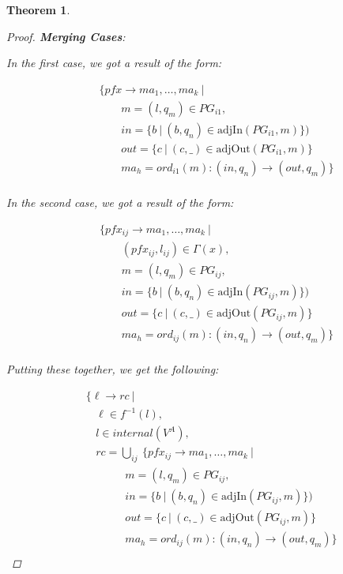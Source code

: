 \documentclass[twocolumn, openany]{sig-alternate-10pt}
\newtheorem{thm}{Theorem}
\begin{document}
\begin{thm}
\begin{proof}
  \vspace{1em}
  \textbf{Merging Cases}:

  In the first case, we got a result of the form:

  \[ \begin{array}{l}
     ~~~~~~~~~ \{ pfx \rightarrow ma_1, \dots, ma_k ~\vert~ \\
     ~~~~~~~~~~~~~~~~~~ m = (l,q_m) \in PG_{i1}, \\
     ~~~~~~~~~~~~~~~~~~ in = \{ b ~\vert~ (b,q_n) \in \text{adjIn}(PG_{i1},m) \}) \\
     ~~~~~~~~~~~~~~~~~~ out = \{ c ~\vert~ (c,\_) \in \text{adjOut}(PG_{i1},m) \} \\
     ~~~~~~~~~~~~~~~~~~ ma_h = ord_{i1}(m) : (in,q_n) \rightarrow (out,q_m) \} \\
  \end{array} \]%

  In the second case, we got a result of the form:

 \[ \begin{array}{l}
     ~~~~~~~~~ \{ pfx_{ij} \rightarrow ma_1, \dots, ma_k ~\vert~ \\
     ~~~~~~~~~~~~~~~~~~ (pfx_{ij}, l_{ij}) \in \Gamma(x), \\
     ~~~~~~~~~~~~~~~~~~ m = (l,q_m) \in PG_{ij}, \\
     ~~~~~~~~~~~~~~~~~~ in = \{ b ~\vert~ (b,q_n) \in \text{adjIn}(PG_{ij},m) \}) \\
     ~~~~~~~~~~~~~~~~~~ out = \{ c ~\vert~ (c,\_) \in \text{adjOut}(PG_{ij},m) \} \\
     ~~~~~~~~~~~~~~~~~~ ma_h = ord_{ij}(m) : (in,q_n) \rightarrow (out,q_m) \} \\
  \end{array} \]%

  Putting these together, we get the following:

  \[ \begin{array}{l}
     ~~~~~ \{ \ell \rightarrow rc ~\vert~ \\
     ~~~~~~~~~ \ell \in f^{-1}(l), \\
     ~~~~~~~~~ l \in internal(V^A), \\
     ~~~~~~~~~ rc = \bigcup_{ij}~ \{ pfx_{ij} \rightarrow ma_1, \dots, ma_k ~\vert~ \\
     ~~~~~~~~~~~~~~~~~~~~~ m = (l,q_m) \in PG_{ij}, \\
     ~~~~~~~~~~~~~~~~~~~~~ in = \{ b ~\vert~ (b,q_n) \in \text{adjIn}(PG_{ij},m) \}) \\
     ~~~~~~~~~~~~~~~~~~~~~ out = \{ c ~\vert~ (c,\_) \in \text{adjOut}(PG_{ij},m) \} \\
     ~~~~~~~~~~~~~~~~~~~~~ ma_h = ord_{ij}(m) : (in,q_n) \rightarrow (out,q_m) \} \\
  \end{array} \]%



\end{proof}
\end{thm}
\end{document}
